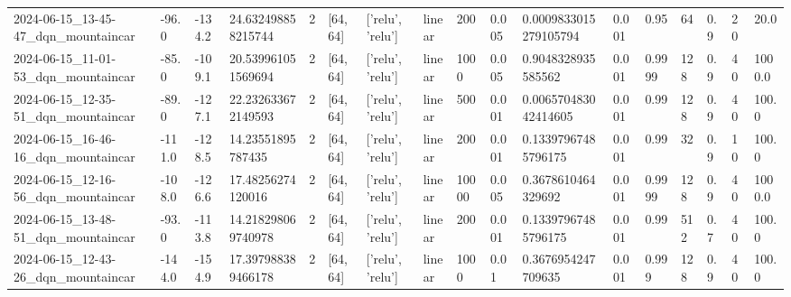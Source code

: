 \documentclass[a4paper,12pt]{article}
\begin{document}
\begin{table}[]
\begin{tabular}{lllllllllllllllll}
    2024-06-15\_13-45-47\_dqn\_mountaincar & -96.0                 & -134.2                  & 24.632498858215744     & 2              & {[}64, 64{]}      & {[}'relu', 'relu'{]}   & linear                    & 200           & 0.005          & 0.0009833015279105794 & 0.001        & 0.95           & 64          & 0.9      & 20                    & 20.0          \\
    2024-06-15\_11-01-53\_dqn\_mountaincar & -85.0                 & -109.1                  & 20.539961051569694     & 2              & {[}64, 64{]}      & {[}'relu', 'relu'{]}   & linear                    & 1000          & 0.005          & 0.9048328935585562    & 0.001        & 0.9999         & 128         & 0.9      & 40                    & 1000.0        \\
    2024-06-15\_12-35-51\_dqn\_mountaincar & -89.0                 & -127.1                  & 22.232633672149593     & 2              & {[}64, 64{]}      & {[}'relu', 'relu'{]}   & linear                    & 500           & 0.001          & 0.006570483042414605  & 0.001        & 0.99           & 128         & 0.9      & 40                    & 100.0         \\
    2024-06-15\_16-46-16\_dqn\_mountaincar & -111.0                & -128.5                  & 14.23551895787435      & 2              & {[}64, 64{]}      & {[}'relu', 'relu'{]}   & linear                    & 200           & 0.001          & 0.13397967485796175   & 0.001        & 0.99           & 32          & 0.9      & 10                    & 100.0         \\
    2024-06-15\_12-16-56\_dqn\_mountaincar & -108.0                & -126.6                  & 17.48256274120016      & 2              & {[}64, 64{]}      & {[}'relu', 'relu'{]}   & linear                    & 10000         & 0.005          & 0.3678610464329692    & 0.001        & 0.9999         & 128         & 0.9      & 40                    & 1000.0        \\
    2024-06-15\_13-48-51\_dqn\_mountaincar & -93.0                 & -113.8                  & 14.218298069740978     & 2              & {[}64, 64{]}      & {[}'relu', 'relu'{]}   & linear                    & 200           & 0.001          & 0.13397967485796175   & 0.001        & 0.99           & 512         & 0.7      & 40                    & 100.0         \\
    2024-06-15\_12-43-26\_dqn\_mountaincar & -144.0                & -154.9                  & 17.397988389466178     & 2              & {[}64, 64{]}      & {[}'relu', 'relu'{]}   & linear                    & 1000          & 0.01           & 0.3676954247709635    & 0.001        & 0.999          & 128         & 0.9      & 40                    & 100.0         \\

\end{tabular}
\end{table}
\end{document}
